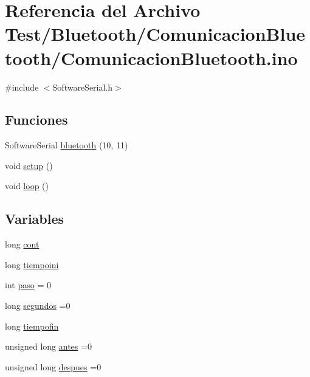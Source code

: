 \hypertarget{_comunicacion_bluetooth_8ino}{}\section{Referencia del Archivo Test/\+Bluetooth/\+Comunicacion\+Bluetooth/\+Comunicacion\+Bluetooth.ino}
\label{_comunicacion_bluetooth_8ino}
{\ttfamily \#include $<$Software\+Serial.\+h$>$}\newline
\subsection*{Funciones}
\begin{DoxyCompactItemize}
\item 
Software\+Serial \hyperlink{_comunicacion_bluetooth_8ino_a2e70a7fdaa23751d09e00821518e2e8e}{bluetooth} (10, 11)
\item 
void \hyperlink{_comunicacion_bluetooth_8ino_a4fc01d736fe50cf5b977f755b675f11d}{setup} ()
\item 
void \hyperlink{_comunicacion_bluetooth_8ino_afe461d27b9c48d5921c00d521181f12f}{loop} ()
\end{DoxyCompactItemize}
\subsection*{Variables}
\begin{DoxyCompactItemize}
\item 
long \hyperlink{_comunicacion_bluetooth_8ino_a7bbddd0fc91df86ed08247a8e6a6dd93}{cont}
\item 
long \hyperlink{_comunicacion_bluetooth_8ino_a393db45a64ea64b37604b453be84b647}{tiempoini}
\item 
int \hyperlink{_comunicacion_bluetooth_8ino_aee735a76e97b916806e2a2a2236fa46f}{paso} = 0
\item 
long \hyperlink{_comunicacion_bluetooth_8ino_a73bada353d3ad0039c547b8686cee3cc}{segundos} =0
\item 
long \hyperlink{_comunicacion_bluetooth_8ino_a978654102eb8f7436d2189cec590168c}{tiempofin}
\item 
unsigned long \hyperlink{_comunicacion_bluetooth_8ino_abba25de424a393eee7675d51a42d97b8}{antes} =0
\item 
unsigned long \hyperlink{_comunicacion_bluetooth_8ino_a4efb489bddc8963173f88aee9522a197}{despues} =0
\end{DoxyCompactItemize}


